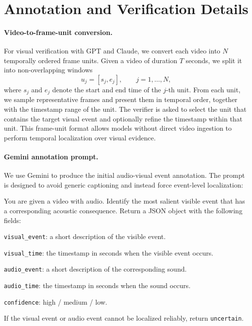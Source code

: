 \documentclass{llmxive}
\begin{document}
\section{Annotation and Verification Details}
\label{app:annotation}

\paragraph{Video-to-frame-unit conversion.}
For visual verification with GPT and Claude, we convert each video into $N$ temporally ordered frame units. Given a video of duration $T$ seconds, we split it into non-overlapping windows
\[
    u_j = [s_j, e_j], \qquad j=1,\ldots,N,
\]
where $s_j$ and $e_j$ denote the start and end time of the $j$-th unit. From each unit, we sample representative frames and present them in temporal order, together with the timestamp range of the unit. The verifier is asked to select the unit that contains the target visual event and optionally refine the timestamp within that unit. This frame-unit format allows models without direct video ingestion to perform temporal localization over visual evidence.

\paragraph{Gemini annotation prompt.}
We use Gemini to produce the initial audio-visual event annotation. The prompt is designed to avoid generic captioning and instead force event-level localization:
\begin{tcolorbox}[colback=gray!3,colframe=gray!35,boxrule=0.5pt,arc=2pt]
\small
You are given a video with audio. Identify the most salient visible event that has a corresponding acoustic consequence.  
Return a JSON object with the following fields:

\texttt{visual\_event}: a short description of the visible event.  

\texttt{visual\_time}: the timestamp in seconds when the visible event occurs.  

\texttt{audio\_event}: a short description of the corresponding sound.  

\texttt{audio\_time}: the timestamp in seconds when the sound occurs.  

\texttt{confidence}: high / medium / low.

If the visual event or audio event cannot be localized reliably, return \texttt{uncertain}.
\end{tcolorbox}
\end{document}
